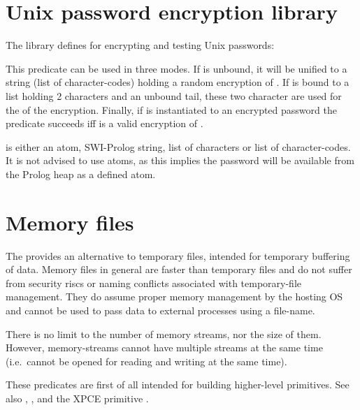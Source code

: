 \documentclass[11pt]{article}
\begin{document}
\section{Unix password encryption library}

The  library defines  for encrypting and testing
Unix passwords:

\begin{description}
This predicate can be used in three modes.  If  is
unbound, it will be unified to a string (list of character-codes)
holding a random encryption of .  If 
is bound to a list holding 2 characters and an unbound tail, these
two character are used for the  of the encryption. Finally,
if  is instantiated to an encrypted password the
predicate succeeds iff  is a valid encryption of
.

 is either an atom, SWI-Prolog string, list of characters
or list of character-codes.  It is not advised to use atoms, as this
implies the password will be available from the Prolog heap as a
defined atom.
\end{description}

\section{Memory files}

The  provides an alternative to temporary files, intended
for temporary buffering of data. Memory files in general are faster than
temporary files and do not suffer from security riscs or naming
conflicts associated with temporary-file management.  They do
assume proper memory management by the hosting OS and cannot be used
to pass data to external processes using a file-name.

There is no limit to the number of memory streams, nor the size of them.
However, memory-streams cannot have multiple streams at the same time
(i.e.\ cannot be opened for reading and writing at the same time).

These predicates are first of all intended for building higher-level
primitives.  See also , ,  and
the XPCE primitive .
\end{document}
